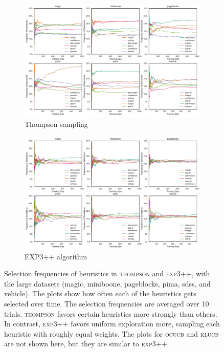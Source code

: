 \documentclass[fleqn,10pt,lineno]{wlpeerj} %
\providecommand{\DIFaddbeginFL}{} %
\begin{document}
\begin{figure}[tbp]
	\centering
	\begin{subfigure}[t]{\textwidth}
        \centering
        \includegraphics[width=\textwidth]{figures/selection-thompson-large}
		\caption{Thompson sampling}
		\label{fig:selection-thompson-large}
	\end{subfigure}
	\begin{subfigure}[t]{\textwidth}
        \centering
        \includegraphics[width=\textwidth]{figures/selection-exp++-large}
		\caption{EXP3++ algorithm}
		\label{fig:selection-exp-large}
    \end{subfigure}
	\caption[Heuristic selection frequencies]{Selection frequencies of
	heuristics in \textsc{thompson} and \textsc{exp3++}, with the large
	datasets (magic, miniboone, pageblocks, pima, sdss, and vehicle). The plots
	show how often each of the heuristics gets selected over time. The
	selection frequencies are averaged over 10 trials. \textsc{thompson} favors
	certain heuristics more strongly than others. In contrast, \textsc{exp3++}
	favors uniform exploration more, sampling each heuristic with roughly equal
	weights. The plots for \textsc{ocucb} and \textsc{klucb} are not shown
	here, but they are similar to \textsc{exp3++}.}
	\label{fig:selection}
\DIFaddbeginFL \end{figure}
\end{document}
